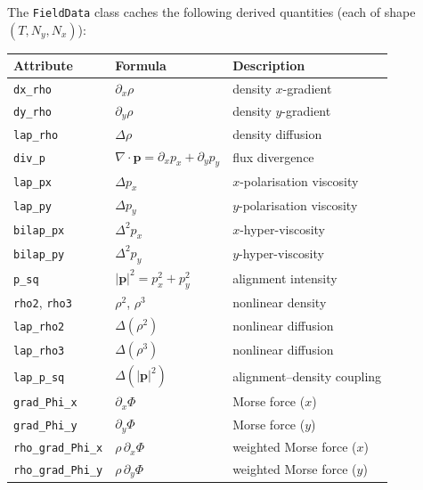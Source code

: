 \documentclass[11pt, letterpaper]{article}
\theoremstyle{definition}
\newcommand{\vp}{\mathbf{p}}
\newcommand{\lap}{\Delta}
\newcommand{\bilap}{\Delta^{2}}
\newcommand{\divop}{\nabla\!\cdot}
\begin{document}
The \texttt{FieldData} class caches the following derived quantities
(each of shape $(T, N_y, N_x)$):
\begin{center}
\renewcommand{\arraystretch}{1.3}
\begin{tabular}{lll}
  \toprule
  \textbf{Attribute} & \textbf{Formula} & \textbf{Description} \\
  \midrule
  \texttt{dx\_rho}         & $\partial_x \rho$                          & density $x$-gradient \\
  \texttt{dy\_rho}         & $\partial_y \rho$                          & density $y$-gradient \\
  \texttt{lap\_rho}        & $\lap\rho$                                 & density diffusion \\
  \texttt{div\_p}          & $\divop\vp = \partial_x p_x + \partial_y p_y$ & flux divergence \\
  \texttt{lap\_px}         & $\lap p_x$                                 & $x$-polarisation viscosity \\
  \texttt{lap\_py}         & $\lap p_y$                                 & $y$-polarisation viscosity \\
  \texttt{bilap\_px}       & $\bilap p_x$                               & $x$-hyper-viscosity \\
  \texttt{bilap\_py}       & $\bilap p_y$                               & $y$-hyper-viscosity \\
  \texttt{p\_sq}           & $|\vp|^{2} = p_x^{2} + p_y^{2}$           & alignment intensity \\
  \texttt{rho2}, \texttt{rho3} & $\rho^{2}$, $\rho^{3}$                & nonlinear density \\
  \texttt{lap\_rho2}       & $\lap(\rho^{2})$                           & nonlinear diffusion \\
  \texttt{lap\_rho3}       & $\lap(\rho^{3})$                           & nonlinear diffusion \\
  \texttt{lap\_p\_sq}      & $\lap(|\vp|^{2})$                          & alignment--density coupling \\
  \texttt{grad\_Phi\_x}    & $\partial_x\Phi$                           & Morse force ($x$) \\
  \texttt{grad\_Phi\_y}    & $\partial_y\Phi$                           & Morse force ($y$) \\
  \texttt{rho\_grad\_Phi\_x} & $\rho\,\partial_x\Phi$                  & weighted Morse force ($x$) \\
  \texttt{rho\_grad\_Phi\_y} & $\rho\,\partial_y\Phi$                  & weighted Morse force ($y$) \\

\end{tabular}
\end{center}
\end{document}
